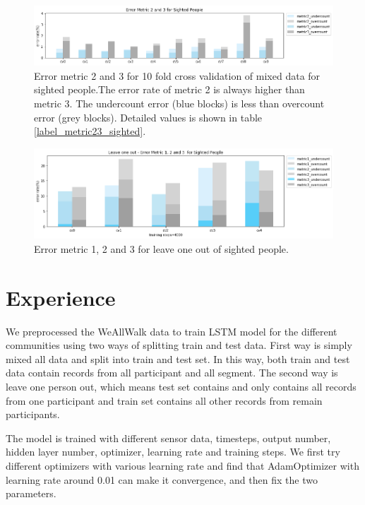 \documentclass[11pt]{article}
\begin{document}
{\begin{figure}[ht]
\centering
\includegraphics[scale=0.5]{error_metric_23_na_10fold}
\caption{Error metric 2 and 3 for 10 fold cross validation of mixed data for sighted people.The error rate of metric 2 is always higher than metric 3. The undercount error (blue blocks) is less than overcount error (grey blocks). Detailed values is shown in table \ref{label_metric23_sighted}.}
\label{fig:error_metric_23_na_10fold}
\end{figure}

\begin{figure}[ht]
\centering
\includegraphics[scale=0.5]{error_metric_123_na_5fold}
\caption{Error metric 1, 2 and 3 for leave one out of sighted people.}
\label{fig:error_metric_123_na_5fold}
\end{figure}


\section{Experience}

We preprocessed the WeAllWalk data to train LSTM model for the different communities using two ways of splitting train and test data. First way is simply mixed all data and split into train and test set. In this way, both train and test data contain records from all participant and all  segment. The second way is leave one person out, which means test set contains and only contains all records from one participant and train set contains all other records from remain participants.

The model is trained with different sensor data, timesteps, output number, hidden layer number, optimizer, learning rate and training steps. We first try different optimizers with various learning rate and find that AdamOptimizer with learning rate around 0.01 can make it convergence, and then fix the two parameters. 


}
\end{document}
